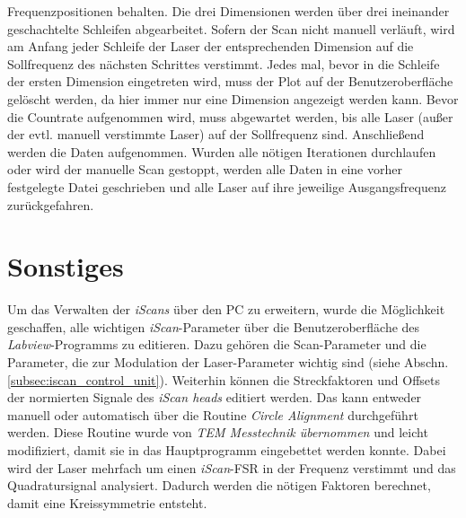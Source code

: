 Frequenzpositionen behalten.
Die drei Dimensionen werden über drei ineinander geschachtelte Schleifen abgearbeitet. Sofern der Scan nicht
manuell verläuft, wird am Anfang jeder Schleife der Laser der entsprechenden
Dimension auf die Sollfrequenz des nächsten Schrittes verstimmt. Jedes mal, bevor in die Schleife
der ersten Dimension eingetreten wird, muss der Plot auf der Benutzeroberfläche
gelöscht werden, da hier immer nur eine Dimension angezeigt werden kann. Bevor
die Countrate aufgenommen wird, muss abgewartet werden, bis alle Laser (außer
der evtl. manuell verstimmte Laser) auf der Sollfrequenz sind.
Anschließend werden die Daten aufgenommen. Wurden alle nötigen Iterationen
durchlaufen oder wird der manuelle Scan gestoppt, werden alle Daten in eine
vorher festgelegte Datei geschrieben und alle Laser auf ihre
jeweilige Ausgangsfrequenz zurückgefahren.

\section{Sonstiges}\label{sec:sonstiges}
Um das Verwalten der \textit{iScans} über den PC zu erweitern, wurde die
Möglichkeit geschaffen, alle wichtigen \textit{iScan}-Parameter über die
Benutzeroberfläche des \textit{Labview}-Programms zu editieren. Dazu gehören
die Scan-Parameter und die Parameter, die zur Modulation der
Laser-Parameter wichtig sind (siehe Abschn. \ref{subsec:iscan_control_unit}).
Weiterhin können die Streckfaktoren und Offsets der normierten Signale des
\textit{iScan heads} editiert werden. Das kann entweder manuell
oder automatisch über die Routine \textit{Circle Alignment} durchgeführt
werden. Diese Routine wurde von \textit{TEM Messtechnik übernommen} und leicht
modifiziert, damit sie in das Hauptprogramm eingebettet werden konnte. Dabei
wird der Laser mehrfach um einen \textit{iScan}-FSR in der Frequenz verstimmt
und das Quadratursignal analysiert. Dadurch werden die nötigen Faktoren
berechnet, damit eine Kreissymmetrie entsteht.